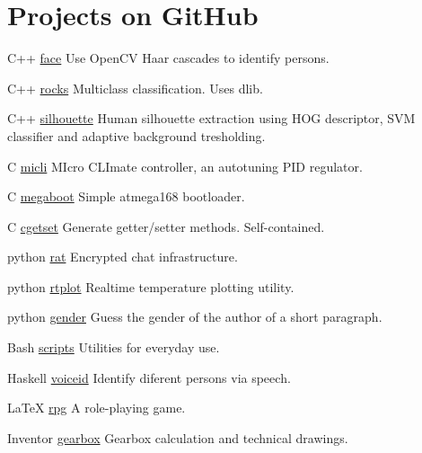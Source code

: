 \documentclass{tccv}
\begin{document}
\section{Projects on GitHub}
\begin{yearlist}
\item{C++}
     {\href{https://github.com/MiroslavVitkov/face}{face}}
     {Use OpenCV Haar cascades to identify persons. }

\item{C++}
     {\href{https://github.com/MiroslavVitkov/rocks}{rocks}}
     {Multiclass classification. Uses dlib.}

\item{C++}
     {\href{https://github.com/MiroslavVitkov/silhouette}{silhouette}}
     {Human silhouette extraction using HOG descriptor, SVM classifier and adaptive background tresholding.}

\item{C}
     {\href{https://github.com/MiroslavVitkov/micli}{micli}}
     {MIcro CLImate controller, an autotuning PID regulator.}

\item{C}
     {\href{https://github.com/MiroslavVitkov/megaboot}{megaboot}}
     {Simple atmega168 bootloader.}


\item{C}
     {\href{https://github.com/MiroslavVitkov/cgetset}{cgetset}}
     {Generate getter/setter methods. Self-contained.}

\item{python}
     {\href{https://github.com/MiroslavVitkov/rat}{rat}}
     {Encrypted chat infrastructure.}


\item{python}
     {\href{https://github.com/MiroslavVitkov/rtplot}{rtplot}}
     {Realtime temperature plotting utility.}


\item{python}
     {\href{https://github.com/MiroslavVitkov/gender}{gender}}
     {Guess the gender of the author of a short paragraph.}


\item{Bash}
     {\href{https://github.com/MiroslavVitkov/scripts}{scripts}}
     {Utilities for everyday use.}


\item{Haskell}
     {\href{https://github.com/MiroslavVitkov/voiceid}{voiceid}}
     {Identify diferent persons via speech.}


\item{LaTeX}
     {\href{https://github.com/MiroslavVitkov/rpg}{rpg}}
     {A role-playing game.}


\item{Inventor}
     {\href{https://github.com/MiroslavVitkov/gearbox}{gearbox}}
     {Gearbox calculation and technical drawings.}
\end{yearlist}
\end{document}
